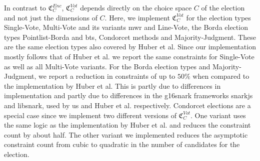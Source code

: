 In contrast to $\mathfrak{C}_C^{Enc}$, $\mathfrak{C}_C^{Vot}$ depends directly on the choice space $C$ of the election and not just the dimensions of $C$.
Here, we implement $\mathfrak{C}_C^{Vot}$ for the election types Single-Vote, Multi-Vote and its variants \gls{mwr} and Line-Vote, the Borda election types Pointlist-Borda and \gls{bts}, Condorcet methods and Majority-Judgment.
These are the same election types also covered by Huber et al.
Since our implementation mostly follows that of Huber et al. we report the same constraints for Single-Vote as well as all Multi-Vote variants.
For the Borda election types and Majority-Judgment, we report a reduction in constraints of up to $50\%$ when compared to the implementation by Huber et al.
This is partly due to differences in implementation and partly due to differences in the \gls{g16snark} frameworks snarkjs and libsnark, used by us and Huber et al. respectively.
Condorcet elections are a special case since we implement two different versions of $\mathfrak{C}_C^{Vot}$.
One variant uses the same logic as the implementation by Huber et al. and reduces the constraint count by about half.
The other variant we implemented reduces the asymptotic constraint count from cubic to quadratic in the number of candidates for the election.

